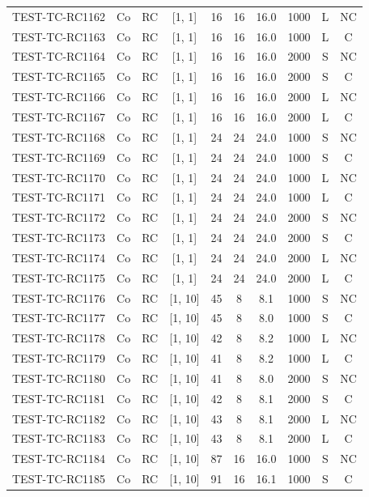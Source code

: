 \begin{longtable}{lccccccccc}
TEST-TC-RC1162 & Co & RC & [1, 1] & 16 & 16 & 16.0 & 1000 & L & NC \\
TEST-TC-RC1163 & Co & RC & [1, 1] & 16 & 16 & 16.0 & 1000 & L & C \\
TEST-TC-RC1164 & Co & RC & [1, 1] & 16 & 16 & 16.0 & 2000 & S & NC \\
TEST-TC-RC1165 & Co & RC & [1, 1] & 16 & 16 & 16.0 & 2000 & S & C \\
TEST-TC-RC1166 & Co & RC & [1, 1] & 16 & 16 & 16.0 & 2000 & L & NC \\
TEST-TC-RC1167 & Co & RC & [1, 1] & 16 & 16 & 16.0 & 2000 & L & C \\
TEST-TC-RC1168 & Co & RC & [1, 1] & 24 & 24 & 24.0 & 1000 & S & NC \\
TEST-TC-RC1169 & Co & RC & [1, 1] & 24 & 24 & 24.0 & 1000 & S & C \\
TEST-TC-RC1170 & Co & RC & [1, 1] & 24 & 24 & 24.0 & 1000 & L & NC \\
TEST-TC-RC1171 & Co & RC & [1, 1] & 24 & 24 & 24.0 & 1000 & L & C \\
TEST-TC-RC1172 & Co & RC & [1, 1] & 24 & 24 & 24.0 & 2000 & S & NC \\
TEST-TC-RC1173 & Co & RC & [1, 1] & 24 & 24 & 24.0 & 2000 & S & C \\
TEST-TC-RC1174 & Co & RC & [1, 1] & 24 & 24 & 24.0 & 2000 & L & NC \\
TEST-TC-RC1175 & Co & RC & [1, 1] & 24 & 24 & 24.0 & 2000 & L & C \\
TEST-TC-RC1176 & Co & RC & [1, 10] & 45 & 8 & 8.1 & 1000 & S & NC \\
TEST-TC-RC1177 & Co & RC & [1, 10] & 45 & 8 & 8.0 & 1000 & S & C \\
TEST-TC-RC1178 & Co & RC & [1, 10] & 42 & 8 & 8.2 & 1000 & L & NC \\
TEST-TC-RC1179 & Co & RC & [1, 10] & 41 & 8 & 8.2 & 1000 & L & C \\
TEST-TC-RC1180 & Co & RC & [1, 10] & 41 & 8 & 8.0 & 2000 & S & NC \\
TEST-TC-RC1181 & Co & RC & [1, 10] & 42 & 8 & 8.1 & 2000 & S & C \\
TEST-TC-RC1182 & Co & RC & [1, 10] & 43 & 8 & 8.1 & 2000 & L & NC \\
TEST-TC-RC1183 & Co & RC & [1, 10] & 43 & 8 & 8.1 & 2000 & L & C \\
TEST-TC-RC1184 & Co & RC & [1, 10] & 87 & 16 & 16.0 & 1000 & S & NC \\
TEST-TC-RC1185 & Co & RC & [1, 10] & 91 & 16 & 16.1 & 1000 & S & C \\

\end{longtable}
